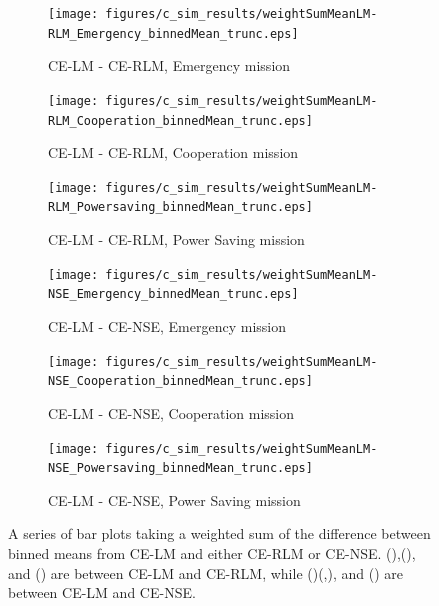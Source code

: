 \begin{figure}[ht]
\begin{subfigure}{0.30\linewidth}
	\centering
	\texttt{[image: figures/c\_sim\_results/weightSumMeanLM-RLM\_Emergency\_binnedMean\_trunc.eps]}
	\caption{CE-LM - CE-RLM, Emergency mission}
	\label{fig:cSimWeightEmer_RLM}
\end{subfigure}\hfill%
\begin{subfigure}{0.30\linewidth}
	\centering
	\texttt{[image: figures/c\_sim\_results/weightSumMeanLM-RLM\_Cooperation\_binnedMean\_trunc.eps]}
	\caption{CE-LM - CE-RLM, Cooperation mission}
	\label{fig:cSimWeightCoop_RLM}
\end{subfigure}\hfill%
\begin{subfigure}{0.30\linewidth}
	\centering
	\texttt{[image: figures/c\_sim\_results/weightSumMeanLM-RLM\_Powersaving\_binnedMean\_trunc.eps]}
	\caption{CE-LM - CE-RLM, Power Saving mission}
	\label{fig:cSimWeightPower_RLM}
\end{subfigure}
\begin{subfigure}{0.30\linewidth}
	\centering
	\texttt{[image: figures/c\_sim\_results/weightSumMeanLM-NSE\_Emergency\_binnedMean\_trunc.eps]}
	\caption{CE-LM - CE-NSE, Emergency mission}
	\label{fig:cSimWeightEmer_NSE}
\end{subfigure}\hfill%
\begin{subfigure}{0.30\linewidth}
	\centering
	\texttt{[image: figures/c\_sim\_results/weightSumMeanLM-NSE\_Cooperation\_binnedMean\_trunc.eps]}
	\caption{CE-LM - CE-NSE, Cooperation mission}
	\label{fig:cSimWeightCoop_NSE}
\end{subfigure}\hfill%
\begin{subfigure}{0.30\linewidth}
	\centering
	\texttt{[image: figures/c\_sim\_results/weightSumMeanLM-NSE\_Powersaving\_binnedMean\_trunc.eps]}
	\caption{CE-LM - CE-NSE, Power Saving mission}
	\label{fig:cSimWeightPower_NSE}
\end{subfigure}%
\caption {A series of bar plots taking a weighted sum of the difference between binned means from CE-LM and either CE-RLM or CE-NSE. (\protect{}),(\protect{}), and (\protect{}) are between CE-LM and CE-RLM, while (\protect{})(,\protect{}), and (\protect{}) are between CE-LM and CE-NSE.} \label{fig:weight_sumFit} 
\end{figure}
\clearpage




